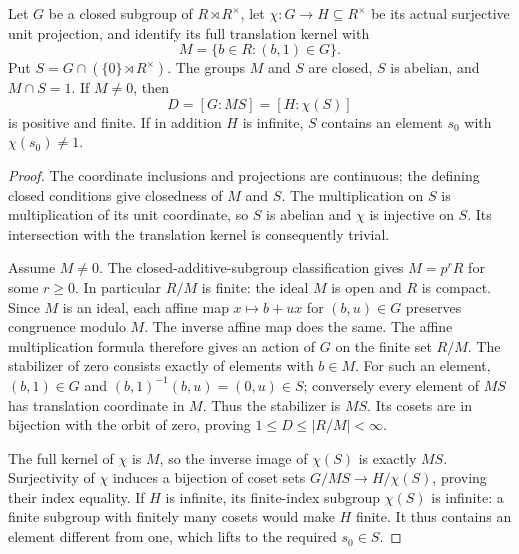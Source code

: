 \begin{lemma}
\label{ft:affine-zero-stabilizer}
\leanok
Let $G$ be a closed subgroup of $R\rtimes R^\times$, let
$\chi:G\longrightarrow H\subseteq R^\times$ be its actual
surjective unit projection, and identify its full translation kernel
with
\[
 M=\{b\in R:(b,1)\in G\}.
\]
Put $S=G\cap(\{0\}\rtimes R^\times)$. The groups $M$ and $S$ are
closed, $S$ is abelian, and $M\cap S=1$. If $M\ne0$, then
\[
 D=[G:MS]=[H:\chi(S)]
\]
is positive and finite. If in addition $H$ is infinite, $S$ contains
an element $s_0$ with $\chi(s_0)\ne1$.
\end{lemma}
\begin{proof}
The coordinate inclusions and projections are continuous; the defining
closed conditions give closedness of $M$ and $S$. The multiplication
on $S$ is multiplication of its unit coordinate, so $S$ is abelian
and $\chi$ is injective on $S$. Its intersection with the translation
kernel is consequently trivial.

Assume $M\ne0$. The closed-additive-subgroup classification gives
$M=p^rR$ for some $r\geq0$. In particular $R/M$ is finite: the ideal
$M$ is open and $R$ is compact. Since $M$ is an ideal, each affine
map $x\mapsto b+ux$ for $(b,u)\in G$ preserves congruence modulo
$M$. The inverse affine map does the same. The affine multiplication
formula therefore gives an action of $G$ on the finite set $R/M$.
The stabilizer of zero consists exactly of elements with $b\in M$.
For such an element, $(b,1)\in G$ and
$(b,1)^{-1}(b,u)=(0,u)\in S$; conversely every element of $MS$
has translation coordinate in $M$. Thus the stabilizer is $MS$.
Its cosets are in bijection with the orbit of zero, proving
$1\leq D\leq |R/M|<\infty$.

The full kernel of $\chi$ is $M$, so the inverse image of $\chi(S)$
is exactly $MS$. Surjectivity of $\chi$ induces a bijection of
coset sets $G/MS\longrightarrow H/\chi(S)$, proving their index
equality. If $H$ is infinite, its finite-index subgroup $\chi(S)$
is infinite: a finite subgroup with finitely many cosets would make
$H$ finite. It thus contains an element different from one, which
lifts to the required $s_0\in S$.
\end{proof}

